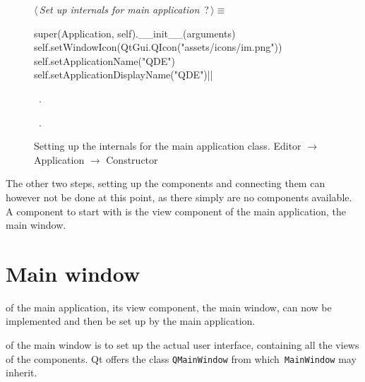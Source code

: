 \documentclass[%
    a4paper,    %
    justified,  %
    nobib,      %
    openany     %
]{tufte-book}
\begin{document}
\begin{figure}[h]
\begin{flushleft} \small
\begin{minipage}{\linewidth}\label{scrap14}\raggedright\small
{} $\langle\,${\itshape Set up internals for main application}\nobreak\ {\footnotesize {?}}$\,\rangle\equiv$
\vspace{-1ex}
\begin{pythoncode}
super(Application, self).__init__(arguments)
self.setWindowIcon(QtGui.QIcon("assets/icons/im.png"))
self.setApplicationName("QDE")
self.setApplicationDisplayName("QDE")|\NWsep|
\end{pythoncode}
\vspace{1.5ex}
\footnotesize
\begin{list}{}{\setlength{\itemsep}{-\parsep}\setlength{\itemindent}{-\leftmargin}}
\item \NWtxtMacroDefBy\ .
\item \NWtxtMacroRefIn\ .

\item{}
\end{list}
\end{minipage}\vspace{4ex}
\end{flushleft}
\caption{Setting up the internals for the main application class.
  \newline{}\newline{}Editor $\rightarrow$ Application $\rightarrow$
  Constructor} \label{editor:lst:app:constructor:internals}
\end{figure}

The other two steps, setting up the components and connecting them can however
not be done at this point, as there simply are no components available. A
component to start with is the view component of the main application, the main
window.

\section{Main window}
\label{appendix:sec:editor:main-window}

 of the main application, its
view component, the main window, can now be implemented and then be set up by
the main application.

 of the main window is to set up the actual
user interface, containing all the views of the components. Qt offers the class
\verb=QMainWindow= from which~\verb=MainWindow= may inherit.
\end{document}
